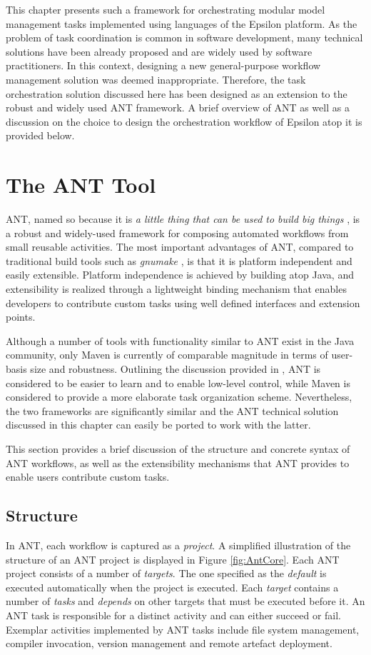 This chapter presents such a framework for orchestrating modular model management tasks implemented using languages of the Epsilon platform. As the problem of task coordination is common in software development, many technical solutions have been already proposed and are widely used by software practitioners. In this context, designing a new general-purpose workflow management solution was deemed inappropriate. Therefore, the task orchestration solution discussed here has been designed as an extension to the robust and widely used ANT \cite{ANT} framework. A brief overview of ANT as well as a discussion on the choice to design the orchestration workflow of Epsilon atop it is provided below.

\section{The ANT Tool}
\label{sec:Workflow.ANT}

ANT, named so because it is \textit{a little thing that can be used to build big things} \cite{AntBook}, is a robust and widely-used framework for composing automated workflows from small reusable activities. The most important advantages of ANT, compared to traditional build tools such as \emph{gnumake} \cite{GnuMake}, is that it is platform independent and easily extensible. Platform independence is achieved by building atop Java, and extensibility is realized through a lightweight binding mechanism that enables developers to contribute custom tasks using well defined interfaces and extension points.

Although a number of tools with functionality similar to ANT exist in the Java community, only Maven \cite{Maven} is currently of comparable magnitude in terms of user-basis size and robustness. Outlining the discussion provided in \cite{AntVsMaven}, ANT is considered to be easier to learn and to enable low-level control, while Maven is considered to provide a more elaborate task organization scheme. Nevertheless, the two frameworks are significantly similar and the ANT technical solution discussed in this chapter can easily be ported to work with the latter.

This section provides a brief discussion of the structure and concrete syntax of ANT workflows, as well as the extensibility mechanisms that ANT provides to enable users contribute custom tasks.

\subsection{Structure}
In ANT, each workflow is captured as a \textit{project}. A simplified illustration of the structure of an ANT project is displayed in Figure \ref{fig:AntCore}. Each ANT project consists of a number of \textit{targets}. The one specified as the \emph{default} is executed automatically when the project is executed. Each \emph{target} contains a number of \emph{tasks} and \emph{depends} on other targets that must be executed before it. An ANT task is responsible for a distinct activity and can either succeed or fail. Exemplar activities implemented by ANT tasks include file system management, compiler invocation, version management and remote artefact deployment.

